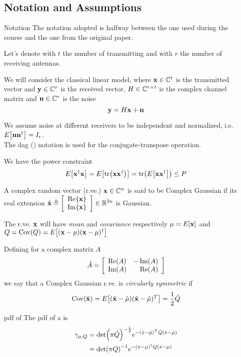 \subsection{Notation and Assumptions}
\begin{frame}[allowframebreaks]{Notation}
The notation adopted is halfway between the one used during the course and the one from the original paper.

\myspace
Let's denote with $t$ the number of transmitting and with $r$ the number of receiving antennas.

\myspace
We will consider the classical linear model, where $\vb{x}\in \mathbb{C}^{t}$ is the transmitted vector and $\vb{y}\in \mathbb{C}^{r}$ is the received vector, $H\in \mathbb{C}^{r\times t}$ is the complex channel matrix and $\vb{n}\in \mathbb{C}^{r}$ is the noise
$$\vb{y} = H\vb{x} + \vb{n}$$

\framebreak

We assume noise at different receivers to be independent and normalized, i.e. $E_{}\qty[\vb{n} \vb{n}^\dagger] = I_r$.\\
The dag (\dag) notation is used for the conjugate-transpose operation.

\myspace
We have the power constraint
$$E_{}\qty[\vb{x}^\dagger\vb{x}] = E_{}\qty[\tr(\vb{x}\vb{x}^\dagger)] = \tr(E_{}\qty[\vb{x}\vb{x}^\dagger])\leq P$$

\myspace
A complex random vector (r.ve.) $\vb{x}\in \mathbb{C}^{n}$ is said to be Complex Gaussian if its real extension $\hat{\vb{x}} \triangleq \qty[\begin{array}{c}
\Re{\vb{x}}\\
\Im{\vb{x}}
\end{array}]
\in \mathbb{R}^{2n}$ is Gaussian.

\myspace
The r.ve. $\vb{x}$ will have \textit{mean} and \textit{covariance} respectively $\mu= E_{}\qty[\vb{x}]$ and $Q = \text{Cov}\qty(Q) = E_{}\qty[(\vb{x}-\mu)(\vb{x}-\mu)^\dagger]$

\framebreak

Defining for a complex matrix $A$
$$\hat{A} = \qty[\begin{array}{lr}
\Re(A) & -\Im(A)\\
\Im(A) & \Re(A)
\end{array}]$$
we say that a Complex Gaussian r.ve. is \textit{circularly symmetric} if
$$\text{Cov}\qty(\hat{\vb{x}}) = E_{}\qty[(\hat{\vb{x}}-\hat{\mu})(\hat{\vb{x}}-\hat{\mu})^T] = \frac{1}{2} \hat{Q}$$

\begin{block}{pdf of \cscg}
	The pdf of a \cscg is
	\begin{align*}
	\begin{split}
	\gamma_{\mu,Q} &= \det(\pi\hat{Q})^{-\frac{1}{2}} e^{-(\hat{x}-\hat{\mu})^T\hat{Q}(\hat{x}-\hat{\mu})}\\
	&= \det(\pi Q)^{-1} e^{-(x-\mu)^\dagger Q(x-\mu)}
	\end{split}
	\end{align*}
\end{block}

\end{frame}

